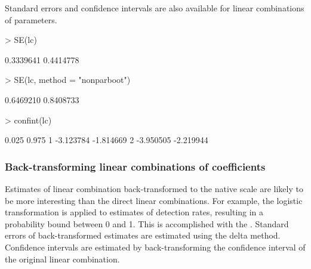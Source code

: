 \documentclass[article,shortnames]{jss}
\begin{document}
Standard errors and confidence intervals are also available for linear
combinations of parameters.

\begin{Schunk}
\begin{Sinput}
> SE(lc)
\end{Sinput}
\begin{Soutput}
[1] 0.3339641 0.4414778
\end{Soutput}
\begin{Sinput}
> SE(lc, method = "nonparboot")
\end{Sinput}
\begin{Soutput}
[1] 0.6469210 0.8408733
\end{Soutput}
\begin{Sinput}
> confint(lc)
\end{Sinput}
\begin{Soutput}
      0.025     0.975
1 -3.123784 -1.814669
2 -3.950505 -2.219944
\end{Soutput}
\end{Schunk}

\subsubsection{Back-transforming linear combinations of coefficients}

Estimates of linear combination back-transformed to the native scale
are likely to be more interesting than the direct linear combinations.
For example, the logistic transformation is applied to estimates of
detection rates, resulting in a probability bound between 0 and
1. This is accomplished with the .  Standard
errors of back-transformed estimates are estimated using the delta
method.  Confidence intervals are estimated by back-transforming the
confidence interval of the original linear combination.
\end{document}
